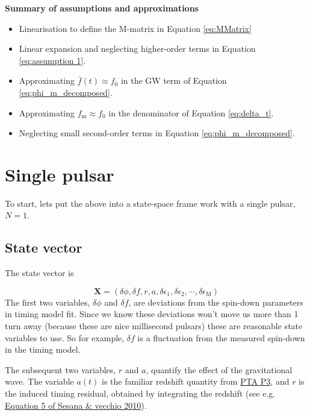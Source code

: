 \documentclass{tufte-handout} %
\begin{document}
\textbf{Summary of assumptions and approximations }
\begin{itemize}
	\item  Linearisation to define the M-matrix in Equation \eqref{eq:MMatrix}
	\item Linear expansion and neglecting higher-order terms in Equation \eqref{eq:assumption 1}.
	\item Approximating $\bar{f}(t) \approx f_0$ in the GW term of Equation \eqref{eq:phi_m_decomposed}.
	\item Approximating $f_{\text{m}} \approx f_0$ in the denominator of Equation \eqref{eq:delta_t}.
	\item Neglecting small second-order terms in Equation \eqref{eq:phi_m_decomposed}.

\end{itemize}





\section{Single pulsar}\label{sec:single_pulsar}
To start, lets put the above into a state-space frame work with a single pulsar, $N=1$. \newline 

\subsection{State vector}

\noindent The state vector is 

\begin{equation}
	\boldsymbol{X} = \left(\delta \phi, \delta f, r,a,\delta \epsilon_1, \delta \epsilon_2, \cdots, \delta \epsilon_{\mathrm M} \right)
\end{equation}
The first two variables, $\delta \phi$ and $\delta f$, are deviations from the spin-down parameters in timing model fit. Since we know these deviations won't move us more than 1 turn away (because these are nice millisecond pulsars) these are reasonable state variables to use. So for example, $\delta f$ is a fluctuation from the measured spin-down in the timing model. \newline 


\noindent The subsequent two variables, $r$ and $a$, quantify the effect of the gravitational wave. The variable $a(t)$ is the familiar redshift quantity from \href{https://arxiv.org/abs/2501.06990}{PTA P3}, and $r$ is the induced timing residual, obtained by integrating the redshift (see e.g. \href{https://arxiv.org/abs/1003.0677}{Equation 5 of Sesana \& vecchio 2010}). \newline 
\end{document}
